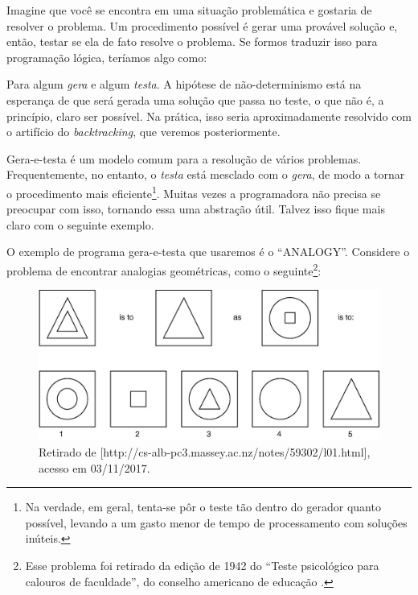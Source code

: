 \documentclass{article}
\theoremstyle{remark}
\theoremstyle{theorem}
\begin{document}
  Imagine que você se encontra em uma situação problemática e gostaria de resolver o problema. Um procedimento possível é gerar uma provável solução e, então, testar se ela de fato resolve o problema. Se formos traduzir isso para programação lógica, teríamos algo como:



Para algum \textit{gera} e algum \textit{testa}. A hipótese de não-determinismo está na esperança de que será gerada uma solução que passa no teste, o que não é, a princípio, claro ser possível. Na prática, isso seria aproximadamente resolvido com o artifício do \textit{backtracking}, que veremos posteriormente.

Gera-e-testa é um modelo comum para a resolução de vários problemas. Frequentemente, no entanto, o \textit{testa} está mesclado com o \textit{gera}, de modo a tornar o procedimento mais eficiente\footnote{Na verdade, em geral, tenta-se pôr o teste tão dentro do gerador quanto possível, levando a um gasto menor de tempo de processamento com soluções inúteis.}. Muitas vezes a programadora não precisa se preocupar com isso, tornando essa uma abstração útil. Talvez isso fique mais claro com o seguinte exemplo.

O exemplo de programa gera-e-testa que usaremos é o ``ANALOGY''. Considere o problema de encontrar analogias geométricas, como o seguinte\footnote{Esse problema foi retirado da edição de 1942 do ``Teste psicológico para calouros de faculdade'', do conselho americano de educação \cite{evans}.}:\vspace{1cm}


\begin{figure}[h]
  \caption{Retirado de [http://cs-alb-pc3.massey.ac.nz/notes/59302/l01.html], acesso em 03/11/2017.}
  \centering
  \includegraphics[width=\linewidth]{analogy}
\end{figure}
\end{document}
